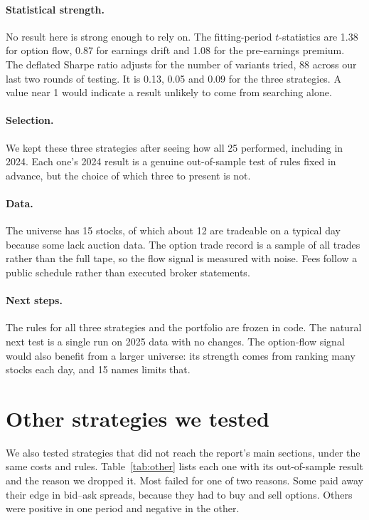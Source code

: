 \documentclass[11pt]{article}
\begin{document}
\paragraph{Statistical strength.} No result here is strong enough to rely on. The fitting-period $t$-statistics are 1.38 for option flow, 0.87 for earnings drift and 1.08 for the pre-earnings premium. The deflated Sharpe ratio \citep{bailey2014} adjusts for the number of variants tried, 88 across our last two rounds of testing. It is 0.13, 0.05 and 0.09 for the three strategies. A value near 1 would indicate a result unlikely to come from searching alone.

\paragraph{Selection.} We kept these three strategies after seeing how all 25 performed, including in 2024. Each one's 2024 result is a genuine out-of-sample test of rules fixed in advance, but the choice of which three to present is not.

\paragraph{Data.} The universe has 15 stocks, of which about 12 are tradeable on a typical day because some lack auction data. The option trade record is a sample of all trades rather than the full tape, so the flow signal is measured with noise. Fees follow a public schedule rather than executed broker statements.

\paragraph{Next steps.} The rules for all three strategies and the portfolio are frozen in code. The natural next test is a single run on 2025 data with no changes. The option-flow signal would also benefit from a larger universe: its strength comes from ranking many stocks each day, and 15 names limits that.

\clearpage
\appendix
\section{Other strategies we tested}\label{app:other}

We also tested strategies that did not reach the report's main sections, under the same costs and rules. Table~\ref{tab:other} lists each one with its out-of-sample result and the reason we dropped it. Most failed for one of two reasons. Some paid away their edge in bid--ask spreads, because they had to buy and sell options. Others were positive in one period and negative in the other.
\end{document}
